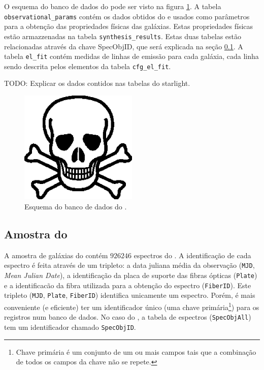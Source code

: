 O esquema do banco de dados do \starlight pode ser visto na figura
\ref{fig:EsquemaBDStarlight}. A tabela \texttt{observational\_params} contém os
dados obtidos do \SDSS e usados como parâmetros para a obtenção das propriedades
físicas das galáxias. Estas propriedades físicas estão armazzenadas na tabela
\texttt{synthesis\_results}. Estas duas tabelas estão relacionadas através da
chave {SpecObjID}, que será explicada na seção
\ref{sec:Crossmatch:AmostraStarlight}. A tabela \texttt{el\_fit} contém medidas
de linhas de emissão para cada galáxia, cada linha sendo descrita pelos
elementos da tabela \texttt{cfg\_el\_fit}.

TODO: Explicar os dados contidos nas tabelas do starlight.

\begin{figure}
	\includegraphics[width=0.5\textwidth]{figuras/test.eps}
	\caption[Esquema do banco de dados do \starlight.]
	{Esquema do banco de dados do \starlight.}
	\label{fig:EsquemaBDStarlight}
\end{figure}

\subsection{Amostra do \STARLIGHT}
\label{sec:Crossmatch:AmostraStarlight}

A amostra de galáxias do \starlight contém $926246$ espectros do \SDSS. A
identificação de cada espectro é feita através de um tripleto: a data juliana
média da observação (\texttt{MJD}, {\em Mean Julian Date}), a identificação da
placa de suporte das fibras ópticas (\texttt{Plate}) e a identificacão da fibra
utilizada para a obtenção do espectro (\texttt{FiberID}). Este tripleto
(\texttt{MJD}, \texttt{Plate}, \texttt{FiberID}) identifica unicamente um
espectro. Porém, é mais conveniente (e eficiente) ter um identificador único
(uma chave primária\footnote{Chave primária é um conjunto de um ou mais campos
tais que a combinação de todos os campos da chave não se repete.}) para os
registros num banco de dados. No caso do \SDSS, a tabela de espectros
(\texttt{SpecObjAll}) tem um identificador chamado \texttt{SpecObjID}.

